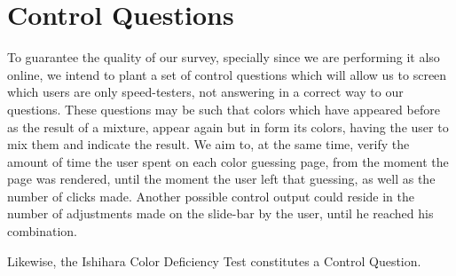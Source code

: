 \documentclass{report}
\begin{document}
\section{Control Questions}
To guarantee the quality of our survey, specially since we are performing it also online, we intend to plant a set of control questions which will
allow us to screen which users are only speed-testers, not answering in a correct way to our questions. These questions may be such that colors
which have appeared before as the result of a mixture, appear again but in form its colors, having the user to mix them and indicate the result. We
aim to, at the same time, verify the amount of time the user spent on each color guessing page, from the moment the page was rendered, until the moment
the user left that guessing, as well as the number of clicks made. Another possible control output could reside in the number of adjustments made
on the slide-bar by the user, until he reached his combination. \par
Likewise, the Ishihara Color Deficiency Test constitutes a Control Question.
%
\end{document}
